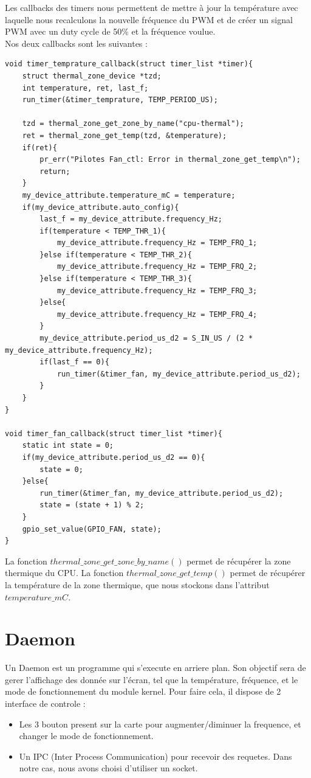 \documentclass[
	a4paper, %
	10pt, %
]{CSUniSchoolLabReport}
\begin{document}
Les callbacks des timers nous permettent de mettre à jour la température avec laquelle nous recalculons la nouvelle fréquence du PWM et de créer un signal PWM avec un duty cycle de 50\% et la fréquence voulue. \\
Nos deux callbacks sont les suivantes :
\begin{lstlisting}[style=CStyle]
void timer_temprature_callback(struct timer_list *timer){
	struct thermal_zone_device *tzd;
	int temperature, ret, last_f;
	run_timer(&timer_temprature, TEMP_PERIOD_US);

	tzd = thermal_zone_get_zone_by_name("cpu-thermal");
	ret = thermal_zone_get_temp(tzd, &temperature);
	if(ret){
		pr_err("Pilotes Fan_ctl: Error in thermal_zone_get_temp\n");
		return;
	}
	my_device_attribute.temperature_mC = temperature;
	if(my_device_attribute.auto_config){
		last_f = my_device_attribute.frequency_Hz;
		if(temperature < TEMP_THR_1){
			my_device_attribute.frequency_Hz = TEMP_FRQ_1;
		}else if(temperature < TEMP_THR_2){
			my_device_attribute.frequency_Hz = TEMP_FRQ_2;
		}else if(temperature < TEMP_THR_3){
			my_device_attribute.frequency_Hz = TEMP_FRQ_3;
		}else{
			my_device_attribute.frequency_Hz = TEMP_FRQ_4;
		}
		my_device_attribute.period_us_d2 = S_IN_US / (2 * my_device_attribute.frequency_Hz);
		if(last_f == 0){
			run_timer(&timer_fan, my_device_attribute.period_us_d2);
		}
	}
}

void timer_fan_callback(struct timer_list *timer){
	static int state = 0;
	if(my_device_attribute.period_us_d2 == 0){
		state = 0;
	}else{
		run_timer(&timer_fan, my_device_attribute.period_us_d2);
		state = (state + 1) % 2;
	}
	gpio_set_value(GPIO_FAN, state);
}
\end{lstlisting}

La fonction $thermal\_zone\_get\_zone\_by\_name()$ permet de récupérer la zone thermique du CPU. La fonction $thermal\_zone\_get\_temp()$ permet de récupérer la température de la zone thermique, que nous stockons dans l'attribut $temperature\_mC$. \\

\section{Daemon}\label{Daemon}
Un Daemon est un programme qui s'execute en arriere plan. 
Son objectif sera de gerer l'affichage des donnée sur l'écran, tel que la température, fréquence, et le mode de fonctionnement du module kernel.
Pour faire cela, il dispose de 2 interface de controle : \\
\begin{itemize}
	\item Les 3 bouton present sur la carte pour augmenter/diminuer la frequence, et changer le mode de fonctionnement.
	\item Un IPC (Inter Process Communication) pour recevoir des requetes. Dans notre cas, nous avons choisi d'utiliser un socket.
\end{itemize}
\end{document}
